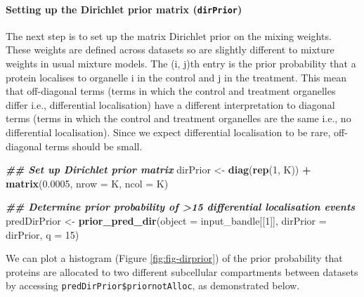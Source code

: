 \documentclass[9pt,a4paper,]{extarticle}
\newenvironment{Shaded}{\begin{snugshade}}{\end{snugshade}}
\newcommand{\AttributeTok}[1]{\textcolor[rgb]{0.13,0.29,0.53}{#1}}
\newcommand{\DecValTok}[1]{\textcolor[rgb]{0.00,0.00,0.81}{#1}}
\newcommand{\DocumentationTok}[1]{\textcolor[rgb]{0.56,0.35,0.01}{\textbf{\textit{#1}}}}
\newcommand{\FloatTok}[1]{\textcolor[rgb]{0.00,0.00,0.81}{#1}}
\newcommand{\FunctionTok}[1]{\textcolor[rgb]{0.13,0.29,0.53}{\textbf{#1}}}
\newcommand{\NormalTok}[1]{#1}
\newcommand{\OtherTok}[1]{\textcolor[rgb]{0.56,0.35,0.01}{#1}}
\newcommand{\SpecialCharTok}[1]{\textcolor[rgb]{0.81,0.36,0.00}{\textbf{#1}}}
\begin{document}
\paragraph{\texorpdfstring{Setting up the Dirichlet prior matrix (\texttt{dirPrior})}{Setting up the Dirichlet prior matrix (dirPrior)}}\label{setting-up-the-dirichlet-prior-matrix-dirprior}

The next step is to set up the matrix Dirichlet prior on the mixing weights.
These weights are defined across datasets so are slightly different to mixture
weights in usual mixture models. The (i, j)th entry is the prior probability
that a protein localises to organelle i in the control and j in the treatment.
This mean that off-diagonal terms (terms in which the control and treatment
organelles differ i.e., differential localisation) have a different interpretation
to diagonal terms (terms in which the control and treatment organelles are the
same i.e., no differential localisation). Since we expect differential localisation
to be rare, off-diagonal terms should be small.

\begin{Shaded}
\begin{Highlighting}[]
\DocumentationTok{\#\# Set up Dirichlet prior matrix}
\NormalTok{dirPrior }\OtherTok{\textless{}{-}} \FunctionTok{diag}\NormalTok{(}\FunctionTok{rep}\NormalTok{(}\DecValTok{1}\NormalTok{, K)) }\SpecialCharTok{+} \FunctionTok{matrix}\NormalTok{(}\FloatTok{0.0005}\NormalTok{, }\AttributeTok{nrow =}\NormalTok{ K, }\AttributeTok{ncol =}\NormalTok{ K)}

\DocumentationTok{\#\# Determine prior probability of \textgreater{}15 differential localisation events}
\NormalTok{predDirPrior }\OtherTok{\textless{}{-}} \FunctionTok{prior\_pred\_dir}\NormalTok{(}\AttributeTok{object =}\NormalTok{ input\_bandle[[}\DecValTok{1}\NormalTok{]],}
                                                    \AttributeTok{dirPrior =}\NormalTok{ dirPrior,}
                                                    \AttributeTok{q =} \DecValTok{15}\NormalTok{)}
\end{Highlighting}
\end{Shaded}

We can plot a histogram (Figure \ref{fig:fig-dirprior}) of the prior
probability that proteins are allocated to two different subcellular
compartments between datasets by accessing \texttt{predDirPrior\$priornotAlloc}, as
demonstrated below.

\begin{Shaded}
\end{Shaded}
\end{document}
